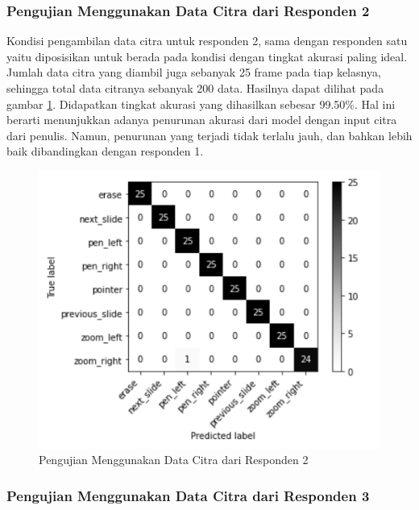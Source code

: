 \subsubsection{Pengujian Menggunakan Data Citra dari Responden 2}
\label{subsec:Pengujian Menggunakan Data Citra dari Responden 2}

Kondisi pengambilan data citra untuk responden 2, sama dengan responden satu yaitu diposisikan untuk berada pada kondisi dengan tingkat akurasi paling ideal. Jumlah data citra yang diambil juga sebanyak 25 frame pada tiap kelasnya, sehingga total data citranya sebanyak 200 data. Hasilnya dapat dilihat pada gambar \ref{fig:Pengujian Menggunakan Data Citra dari Responden 2}. Didapatkan tingkat akurasi yang dihasilkan sebesar 99.50\%. Hal ini berarti menunjukkan adanya penurunan akurasi dari model dengan input citra dari penulis. Namun, penurunan yang terjadi tidak terlalu jauh, dan bahkan lebih baik dibandingkan dengan responden 1. 

\begin{figure}[ht]
  \centering
  \includegraphics[scale=0.85]{gambar/pengujian-ukuran-tangan/tangan-ari.png}
  \caption{Pengujian Menggunakan Data Citra dari Responden 2}
  \label{fig:Pengujian Menggunakan Data Citra dari Responden 2}
\end{figure}

\subsubsection{Pengujian Menggunakan Data Citra dari Responden 3}
\label{subsec:Pengujian Menggunakan Data Citra dari Responden 3}

